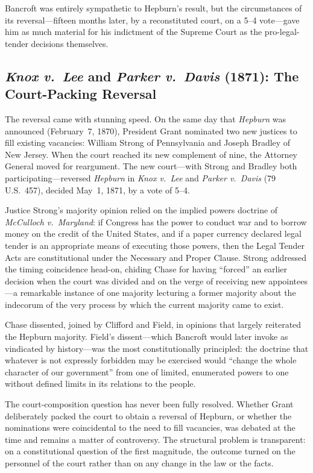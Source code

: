 \documentclass[12pt]{article}
\begin{document}
Bancroft was entirely sympathetic to Hepburn's result, but the
circumstances of its reversal---fifteen months later, by a reconstituted
court, on a 5--4 vote---gave him as much material for his indictment of
the Supreme Court as the pro-legal-tender decisions themselves.

\subsection{\textit{Knox v.\ Lee} and \textit{Parker v.\ Davis} (1871):
The Court-Packing Reversal}

The reversal came with stunning speed. On the same day that
\textit{Hepburn} was announced (February~7, 1870), President Grant
nominated two new justices to fill existing vacancies: William Strong
of Pennsylvania and Joseph Bradley of New Jersey. When the court reached
its new complement of nine, the Attorney General moved for reargument.
The new court---with Strong and Bradley both participating---reversed
\textit{Hepburn} in \textit{Knox v.\ Lee} and \textit{Parker v.\ Davis}
(79 U.S.\ 457), decided May~1, 1871, by a vote of 5--4.

Justice Strong's majority opinion relied on the implied powers doctrine
of \textit{McCulloch v.\ Maryland}: if Congress has the power to conduct
war and to borrow money on the credit of the United States, and if a
paper currency declared legal tender is an appropriate means of executing
those powers, then the Legal Tender Acts are constitutional under the
Necessary and Proper Clause. Strong addressed the timing coincidence
head-on, chiding Chase for having ``forced'' an earlier decision when the
court was divided and on the verge of receiving new appointees---a
remarkable instance of one majority lecturing a former majority about the
indecorum of the very process by which the current majority came to exist.

Chase dissented, joined by Clifford and Field, in opinions that largely
reiterated the Hepburn majority. Field's dissent---which Bancroft would
later invoke as vindicated by history---was the most constitutionally
principled: the doctrine that whatever is not expressly forbidden may
be exercised would ``change the whole character of our government'' from
one of limited, enumerated powers to one without defined limits in its
relations to the people.

The court-composition question has never been fully resolved. Whether
Grant deliberately packed the court to obtain a reversal of Hepburn, or
whether the nominations were coincidental to the need to fill vacancies,
was debated at the time and remains a matter of controversy. The
structural problem is transparent: on a constitutional question of the
first magnitude, the outcome turned on the personnel of the court rather
than on any change in the law or the facts.
\end{document}
